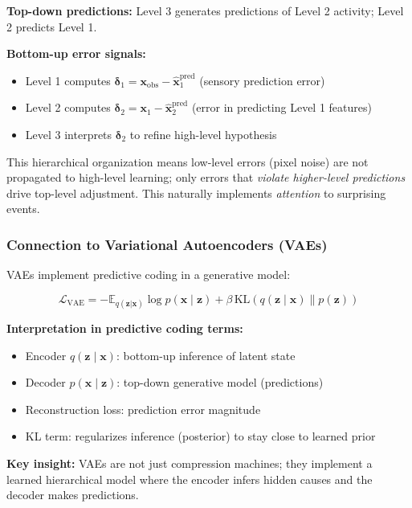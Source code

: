 \textbf{Top-down predictions:} Level 3 generates predictions of Level 2 activity; Level 2 predicts Level 1.

\textbf{Bottom-up error signals:}
\begin{itemize}
    \item Level 1 computes $\boldsymbol{\delta}_1 = \mathbf{x}_{\text{obs}} - \hat{\mathbf{x}}_1^{\text{pred}}$ (sensory prediction error)
    \item Level 2 computes $\boldsymbol{\delta}_2 = \mathbf{x}_1 - \hat{\mathbf{x}}_2^{\text{pred}}$ (error in predicting Level 1 features)
    \item Level 3 interprets $\boldsymbol{\delta}_2$ to refine high-level hypothesis
\end{itemize}

\begin{intuitionbox}
    This hierarchical organization means low-level errors (pixel noise) are not propagated to high-level learning; only errors that \textit{violate higher-level predictions} drive top-level adjustment. This naturally implements \textit{attention} to surprising events.
\end{intuitionbox}

\subsubsection{Connection to Variational Autoencoders (VAEs)}

VAEs implement predictive coding in a generative model:

\[
\mathcal{L}_{\text{VAE}} = -\mathbb{E}_{q(\mathbf{z}|\mathbf{x})} \log p(\mathbf{x} \mid \mathbf{z}) + \beta \, \text{KL}(q(\mathbf{z} \mid \mathbf{x}) \| p(\mathbf{z}))
\]

\textbf{Interpretation in predictive coding terms:}
\begin{itemize}
    \item Encoder $q(\mathbf{z} \mid \mathbf{x})$: bottom-up inference of latent state
    \item Decoder $p(\mathbf{x} \mid \mathbf{z})$: top-down generative model (predictions)
    \item Reconstruction loss: prediction error magnitude
    \item KL term: regularizes inference (posterior) to stay close to learned prior
\end{itemize}

\textbf{Key insight:} VAEs are not just compression machines; they implement a learned hierarchical model where the encoder infers hidden causes and the decoder makes predictions.

